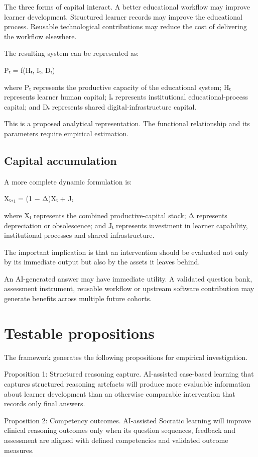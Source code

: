 \documentclass[11pt,a4paper]{article}
\begin{document}
The three forms of capital interact. A better educational workflow may improve learner development. Structured learner records may improve the educational process. Reusable technological contributions may reduce the cost of delivering the workflow elsewhere.

The resulting system can be represented as:

Pₜ = f(Hₜ, Iₜ, Dₜ)

where Pₜ represents the productive capacity of the educational system; Hₜ represents learner human capital; Iₜ represents institutional educational-process capital; and Dₜ represents shared digital-infrastructure capital.

This is a proposed analytical representation. The functional relationship and its parameters require empirical estimation.

\subsection{Capital accumulation}
A more complete dynamic formulation is:

Xₜ₊₁ = (1 − Δ)Xₜ + Jₜ

where Xₜ represents the combined productive-capital stock; Δ represents depreciation or obsolescence; and Jₜ represents investment in learner capability, institutional processes and shared infrastructure.

The important implication is that an intervention should be evaluated not only by its immediate output but also by the assets it leaves behind.

An AI-generated answer may have immediate utility. A validated question bank, assessment instrument, reusable workflow or upstream software contribution may generate benefits across multiple future cohorts.

\section{Testable propositions}
The framework generates the following propositions for empirical investigation.

Proposition 1: Structured reasoning capture. AI-assisted case-based learning that captures structured reasoning artefacts will produce more evaluable information about learner development than an otherwise comparable intervention that records only final answers.

Proposition 2: Competency outcomes. AI-assisted Socratic learning will improve clinical reasoning outcomes only when its question sequences, feedback and assessment are aligned with defined competencies and validated outcome measures.
\end{document}
